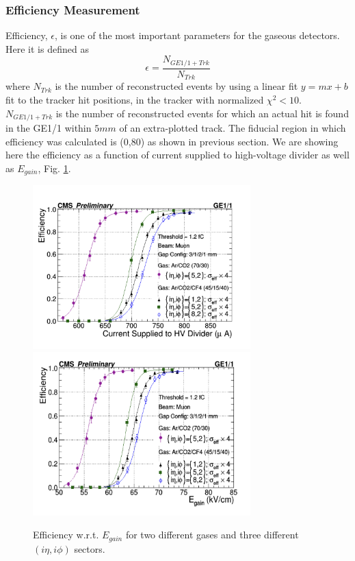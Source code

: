 \subsubsection{Efficiency Measurement}
Efficiency, $\epsilon$, is one of the most important parameters for the gaseous detectors. Here it is defined as 
\begin{equation}
\epsilon = \frac{N_{GE1/1+Trk}}{N_{Trk}}
\end{equation}
where $N_{Trk}$ is the number of reconstructed events by using a linear fit $y = mx + b$ fit to the tracker hit positions, in the tracker with normalized $\chi^2<10$.
$N_{GE1/1+Trk}$ is the number of reconstructed events for which an actual hit is found in the GE1/1 within $5mm$ of an extra-plotted track.
The fiducial region in which efficiency was calculated is (0,80) as shown in previous section.
We are showing here the efficiency as a function of current supplied to high-voltage divider as well as $E_{gain}$, Fig. \ref{Efficiency}. 
\begin{figure}[!htbp]
\centering
\includegraphics[width=0.75\textwidth]{figures/GEM/Efficiency_Current.jpeg}\\
\includegraphics[width=0.75\textwidth]{figures/GEM/Efficiency_EGain.jpeg}
\caption{Efficiency w.r.t. $E_{gain}$ for two different gases and three different $(i\eta,i\phi)$ sectors.}
\label{Efficiency}
\end{figure}
